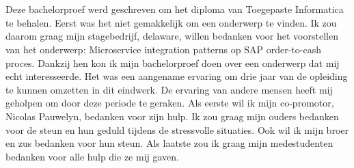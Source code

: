 
\chapter*{}
\label{ch:voorwoord}

Deze bachelorproef werd geschreven om het diploma van Toegepaste Informatica te behalen. Eerst was het niet gemakkelijk om een onderwerp te vinden. Ik zou daarom graag mijn stagebedrijf, delaware, willen bedanken voor het voorstellen van het onderwerp: Microservice integration patterns op SAP order-to-cash proces. Dankzij hen kon ik mijn bachelorproef doen over een onderwerp dat mij echt interesseerde. Het was een aangename ervaring om drie jaar van de opleiding te kunnen omzetten in dit eindwerk. De ervaring van andere mensen heeft mij geholpen om door deze periode te geraken.
Als eerste wil ik mijn co-promotor, Nicolas Pauwelyn, bedanken voor zijn hulp.
Ik zou graag mijn ouders bedanken voor de steun en hun geduld tijdens de stressvolle situaties. Ook wil ik mijn broer en zus bedanken voor hun steun.
Als laatste zou ik graag mijn medestudenten bedanken voor alle hulp die ze mij gaven. 
